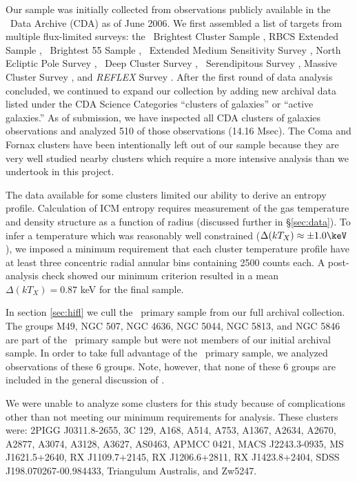 \documentclass{emulateapj}
\begin{document}
Our sample was initially collected from observations publicly
available in the \chandra\ Data Archive (CDA) as of June 2006. We
first assembled a list of targets from multiple flux-limited surveys:
the \rosat\ Brightest Cluster Sample \citep{1998MNRAS.301..881E}, RBCS
Extended Sample \citep{2000MNRAS.318..333E}, \rosat\ Brightest 55
Sample \citep{1990MNRAS.245..559E, 1998MNRAS.298..416P},
\einstein\ Extended Medium Sensitivity Survey
\citep{1990ApJS...72..567G}, North Ecliptic Pole Survey
\citep{2006ApJS..162..304H}, \rosat\ Deep Cluster Survey
\citep{1995ApJ...445L..11R}, \rosat\ Serendipitous Survey
\citep{1998ApJ...502..558V}, Massive Cluster Survey
\citep{2001ApJ...553..668E}, and {\it{REFLEX}} Survey
\citep{reflex}. After the first round of data analysis concluded, we
continued to expand our collection by adding new archival data listed
under the CDA Science Categories ``clusters of galaxies'' or ``active
galaxies.'' As of submission, we have inspected all CDA clusters of
galaxies observations and analyzed 510 of those observations (14.16
Msec). The Coma and Fornax clusters have been intentionally left out
of our sample because they are very well studied nearby clusters which
require a more intensive analysis than we undertook in this project.

The data available for some clusters limited our ability to derive an
entropy profile. Calculation of ICM entropy requires measurement of
the gas temperature and density structure as a function of radius
(discussed further in \S\ref{sec:data}). To infer a temperature which
was reasonably well constrained ($\Delta (kT_X) \approx \pm 1.0
\keV$), we imposed a minimum requirement that each cluster temperature
profile have at least three concentric radial annular bins containing
2500 counts each. A post-analysis check showed our minimum criterion
resulted in a mean $\Delta (kT_X) = 0.87$ keV for the final sample.

In section \ref{sec:hifl} we cull the \hifl\ primary sample
\citep{hiflugcs1, hiflugcs2} from our full archival collection. The
groups M49, NGC 507, NGC 4636, NGC 5044, NGC 5813, and NGC 5846 are
part of the \hifl\ primary sample but were not members of our initial
archival sample. In order to take full advantage of the \hifl\ primary
sample, we analyzed observations of these 6 groups. Note, however,
that none of these 6 groups are included in the general discussion of
\accept.

We were unable to analyze some clusters for this study because of
complications other than not meeting our minimum requirements for
analysis. These clusters were: 2PIGG J0311.8-2655, 3C 129, A168, A514,
A753, A1367, A2634, A2670, A2877, A3074, A3128, A3627, AS0463, APMCC
0421, MACS J2243.3-0935, MS J1621.5+2640, RX J1109.7+2145, RX
J1206.6+2811, RX J1423.8+2404, SDSS J198.070267-00.984433, Triangulum
Australis, and Zw5247.
\end{document}
